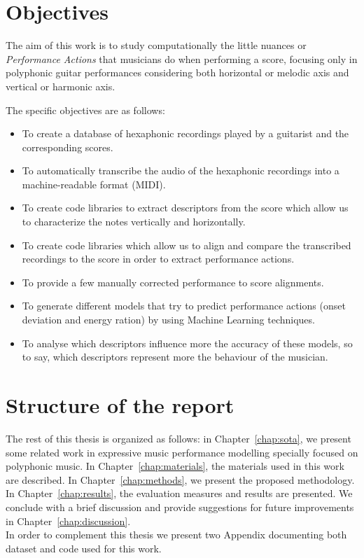 \section{Objectives}
The aim of this work is to study computationally the little nuances or \textit{Performance Actions} that musicians do when performing a score, focusing only in polyphonic guitar performances considering both horizontal or melodic axis and vertical or harmonic axis.

The specific objectives are as follows:

\begin{itemize}[noitemsep]
\item To create a database of hexaphonic recordings played by a guitarist and the corresponding scores.
\item To automatically transcribe the audio of the hexaphonic recordings into a machine-readable format (MIDI).
\item To create code libraries to extract descriptors from the score which allow us to characterize the notes vertically and horizontally.
\item To create code libraries which allow us to align and compare the transcribed recordings to the score in order to extract performance actions.
\item To provide a few manually corrected performance to score alignments.
\item To generate different models that try to predict performance actions (onset deviation and energy ration) by using Machine Learning techniques.
\item To analyse which descriptors influence more the accuracy of these models, so to say, which descriptors represent more the behaviour of the musician.
\end{itemize}

\section{Structure of the report}
The rest of this thesis is organized as follows: in Chapter~\ref{chap:sota}, we present some related work in expressive music performance modelling specially focused on polyphonic music. In Chapter~\ref{chap:materials}, the materials used in this work are described. In Chapter~\ref{chap:methods}, we present the proposed methodology. In Chapter~\ref{chap:results}, the evaluation measures and results are presented. We conclude with a brief discussion and provide suggestions for future improvements in Chapter~\ref{chap:discussion}. \\
In order to complement this thesis we present two Appendix documenting both dataset and code used for this work.
\newpage



